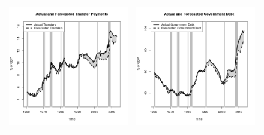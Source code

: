 \documentclass[11pt]{article}
\begin{document}
\begin{figure}
\begin{center}
\begin{tabular}{cc}
\includegraphics[scale=0.45]{./results/pics0.01/pred_transfers.png} & \includegraphics[scale=0.45]{./results/pics0.01/pred_debt.png}  
\end{tabular}
\end{center}
\end{figure} 
\end{document}
